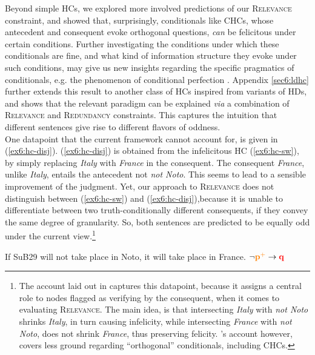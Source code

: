 Beyond simple HCs, we explored more involved predictions of our \textsc{Relevance} constraint, and showed that, surprisingly, conditionals like CHCs, whose antecedent and consequent evoke orthogonal questions, \textit{can} be felicitous under certain conditions. Further investigating the conditions under which these conditionals are fine, and what kind of information structure they evoke under such conditions, may give us new insights regarding the specific pragmatics of conditionals, e.g. the phenomenon of conditional perfection \citep{Geis1971, Lilje1972, Horn1972, deCornulier1983, Matsumoto1995, vanDerAuwera1997, vonFintel1997, vonFintel2001, Herburger2015, Herburger2016, Bassi2018}. Appendix \ref{sec6:ldhc} further extends this result to another class of HCs inspired from variants of HDs, and shows that the relevant paradigm can be explained \textit{via} a combination of \textsc{Relevance} and \textsc{Redundancy} constraints. This captures the intuition that different sentences give rise to different flavors of oddness.\\

One datapoint that the current framework cannot account for, is given in (\ref{ex6:hc-disj}). (\ref{ex6:hc-disj}) is obtained from the infelicitous HC (\ref{ex6:hc-sw}), by simply replacing \textit{Italy} with \textit{France} in the consequent. The consequent \textit{France}, unlike \textit{Italy}, entails the antecedent not \textit{not Noto}. This seems to lead to a sensible improvement of the judgment. Yet, our approach to \textsc{Relevance} does not distinguish between (\ref{ex6:hc-sw}) and (\ref{ex6:hc-disj}),because it is unable to differentiate between two truth-conditionally different consequents, if they convey the same degree of granularity. So, both sentences are predicted to be equally odd under the current view.\footnote{The account laid out in \citet{HenotMortier2024a} captures this datapoint, because it assigns a central role to nodes flagged as verifying by the consequent, when it comes to evaluating \textsc{Relevance}. The main idea, is that intersecting \textit{Italy} with \textit{not Noto} shrinks \textit{Italy}, in turn causing infelicity, while intersecting \textit{France} with \textit{not Noto}, does not shrink \textit{France}, thus preserving felicity. \citeauthor{HenotMortier2024a}'s account however, covers less ground regarding ``orthogonal'' conditionals, including CHCs.}

\begin{exe}
	\ex \label{ex6:hc-disj} {If SuB29 will not take place in Noto, it will take place in France. \hfill $\neg \textbf{\textcolor{orange}{p$^+$}}\rightarrow \textbf{\textcolor{red}{q}}$}
\end{exe}

